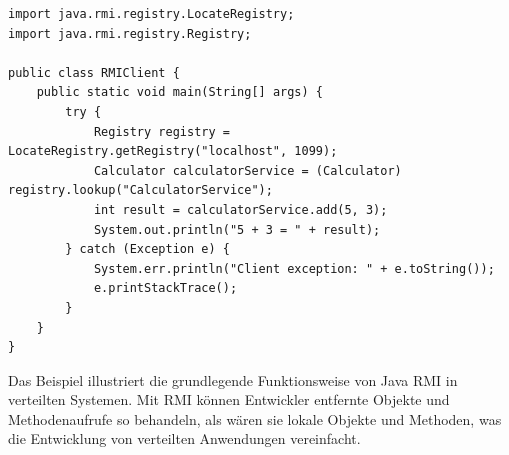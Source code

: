 \noindent\begin{minipage}{\textwidth}
\begin{lstlisting}[caption={ RMI-Client (RMIClient.java)},captionpos=b,label={lst:rmi-server}]
import java.rmi.registry.LocateRegistry;
import java.rmi.registry.Registry;

public class RMIClient {
    public static void main(String[] args) {
        try {
            Registry registry = LocateRegistry.getRegistry("localhost", 1099);
            Calculator calculatorService = (Calculator) registry.lookup("CalculatorService");
            int result = calculatorService.add(5, 3);
            System.out.println("5 + 3 = " + result);
        } catch (Exception e) {
            System.err.println("Client exception: " + e.toString());
            e.printStackTrace();
        }
    }
}
\end{lstlisting}
\end{minipage}
Das Beispiel illustriert die grundlegende Funktionsweise von Java RMI in verteilten Systemen. Mit RMI können Entwickler entfernte Objekte und Methodenaufrufe so behandeln, als wären sie lokale Objekte und Methoden, was die Entwicklung von verteilten Anwendungen vereinfacht.